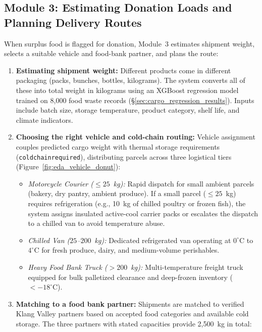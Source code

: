 \documentclass[12pt,a4paper]{article}
\renewcommand{\_}{\oldunderscore\allowbreak}
\begin{document}
\subsection{Module 3: Estimating Donation Loads and Planning Delivery Routes}
When surplus food is flagged for donation, Module~3 estimates shipment weight, selects a suitable vehicle and food-bank partner, and plans the route:
\begin{enumerate}[leftmargin=18pt, itemsep=2.5pt]
    \item \textbf{Estimating shipment weight:} Different products come in different packaging (packs, bunches, bottles, kilograms). The system converts all of these into total weight in kilograms using an XGBoost regression model trained on 8,000 food waste records (§\ref{sec:cargo_regression_results}). Inputs include batch size, storage temperature, product category, shelf life, and climate indicators.
    \item \textbf{Choosing the right vehicle and cold-chain routing:} Vehicle assignment couples predicted cargo weight with thermal storage requirements (\texttt{cold\_chain\_required}), distributing parcels across three logistical tiers (Figure~\ref{fig:eda_vehicle_donut}):
    \begin{itemize}[leftmargin=14pt, itemsep=1.5pt]
        \item \emph{Motorcycle Courier ($\le 25$~kg):} Rapid dispatch for small ambient parcels (bakery, dry pantry, ambient produce). If a small parcel ($\le 25$~kg) requires refrigeration (e.g., 10~kg of chilled poultry or frozen fish), the system assigns insulated active-cool carrier packs or escalates the dispatch to a chilled van to avoid temperature abuse.
        \item \emph{Chilled Van ($25$--$200$~kg):} Dedicated refrigerated van operating at $0^\circ\text{C}$ to $4^\circ\text{C}$ for fresh produce, dairy, and medium-volume perishables.
        \item \emph{Heavy Food Bank Truck ($> 200$~kg):} Multi-temperature freight truck equipped for bulk palletized clearance and deep-frozen inventory ($< -18^\circ\text{C}$).
    \end{itemize}
    \item \textbf{Matching to a food bank partner:} Shipments are matched to verified Klang Valley partners based on accepted food categories and available cold storage. The three partners with stated capacities provide 2,500~kg in total:
    \begin{itemize}[leftmargin=14pt, itemsep=1.5pt]

\end{itemize}
\end{enumerate}
\end{document}
